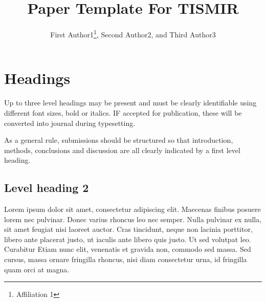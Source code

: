 \documentclass{article}
\title{Paper Template For TISMIR}
\author{First Author1\thanks{Affiliation 1}, Second Author2, and Third Author3}
\begin{document}

\section{Headings}\label{sec:headings}

Up to three level headings may be present and must be clearly identifiable
using different font sizes, bold or italics. IF accepted for publication,
these will be converted into journal during typesetting.

As a general rule, submissions should be structured so that introduction,
methods, conclusions and discussion are all clearly indicated by a first level heading.

\subsection{Level heading 2}

Lorem ipsum dolor sit amet, consectetur adipiscing elit.
Maecenas finibus posuere lorem nec pulvinar. Donec varius
rhoncus leo nec semper. Nulla pulvinar ex nulla, sit amet feugiat
nisi laoreet auctor. Cras tincidunt, neque non lacinia porttitor,
libero ante placerat justo, ut iaculis ante libero quis justo.
Ut sed volutpat leo. Curabitur
Etiam nunc elit, venenatis et gravida non, commodo sed massa.
Sed cursus, massa ornare fringilla rhoncus, nisi diam consectetur urna,
id fringilla quam orci at magna.
\end{document}
